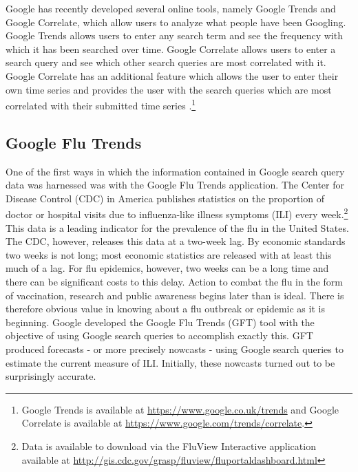 Google has recently developed several online tools, namely Google Trends and Google Correlate, which allow users to analyze what people have been Googling. Google Trends allows users to enter any search term and see the frequency with which it has been searched over time. Google Correlate allows users to enter a search query and see which other search queries are most correlated with it. Google Correlate has an additional feature which allows the user to enter their own time series and provides the user with the search queries which are most correlated with their submitted time series \cite{WhitePaper}.\footnote{Google Trends is available at \url{https://www.google.co.uk/trends} and Google Correlate is available at \url{https://www.google.com/trends/correlate}.} 

\subsection{Google Flu Trends}

One of the first ways in which the information contained in Google search query data was harnessed was with the Google Flu Trends application. The Center for Disease Control (CDC) in America publishes statistics on the proportion of doctor or hospital visits due to influenza-like illness symptoms (ILI) every week.\footnote{Data is available to download via the FluView Interactive application available at \url{ http://gis.cdc.gov/grasp/fluview/fluportaldashboard.html}} This data is a leading indicator for the prevalence of the flu in the United States. The CDC, however, releases this data at a two-week lag. By economic standards two weeks is not long; most economic statistics are released with at least this much of a lag. For flu epidemics, however, two weeks can be a long time and there can be significant costs to this delay. Action to combat the flu in the form of vaccination, research and public awareness begins later than is ideal. There is therefore obvious value in knowing about a flu outbreak or epidemic as it is beginning. Google developed the Google Flu Trends (GFT) tool with the objective of using Google search queries to accomplish exactly this. GFT produced forecasts - or more precisely nowcasts - using Google search queries to estimate the current measure of ILI. Initially, these nowcasts turned out to be surprisingly accurate.

